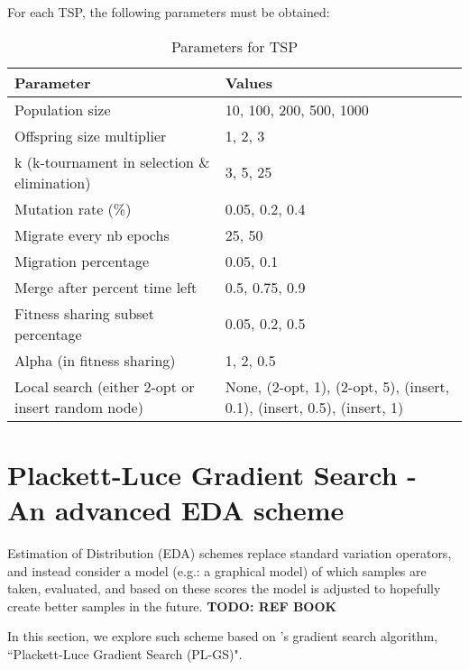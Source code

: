 \documentclass[a4paper,10pt]{article}
\begin{document}
	For each TSP, the following parameters must be obtained:
	\begin{table}[ht]
		\centering
		\begin{tabularx}{0.9\textwidth}{|X|X|}
			\hline
			\textbf{Parameter} & \textbf{Values} \\
			\hline
			Population size & 10, 100, 200, 500, 1000 \\
			\hline
			Offspring size multiplier & 1, 2, 3 \\
			\hline
			k (k-tournament in selection \& elimination) & 3, 5, 25 \\
			\hline
			Mutation rate (\%) & 0.05, 0.2, 0.4 \\
			\hline
			Migrate every nb epochs & 25, 50 \\
			\hline
			Migration percentage & 0.05, 0.1 \\
			\hline
			Merge after percent time left & 0.5, 0.75, 0.9 \\
			\hline
			Fitness sharing subset percentage & 0.05, 0.2, 0.5 \\
			\hline
			Alpha (in fitness sharing) & 1, 2, 0.5 \\
			\hline
			Local search (either 2-opt or insert random node) & None, (2-opt, 1), (2-opt, 5), (insert, 0.1), (insert, 0.5), (insert, 1) \\
			\hline
		\end{tabularx}
		\caption{Parameters for TSP}
	\end{table}

	






\section{Plackett-Luce Gradient Search - An advanced EDA scheme} \label{cha:pl-gs}
	Estimation of Distribution (EDA) schemes replace standard variation operators, and instead consider a model (e.g.: a graphical model) of which samples are taken, evaluated, and based on these scores the model is adjusted to hopefully create better samples in the future. \textbf{TODO: REF BOOK}
	
	In this section, we explore such scheme based on \citeauthor{santucci_gradient_2020}'s gradient search algorithm, ``Plackett-Luce Gradient Search (PL-GS)".
	
\end{document}

